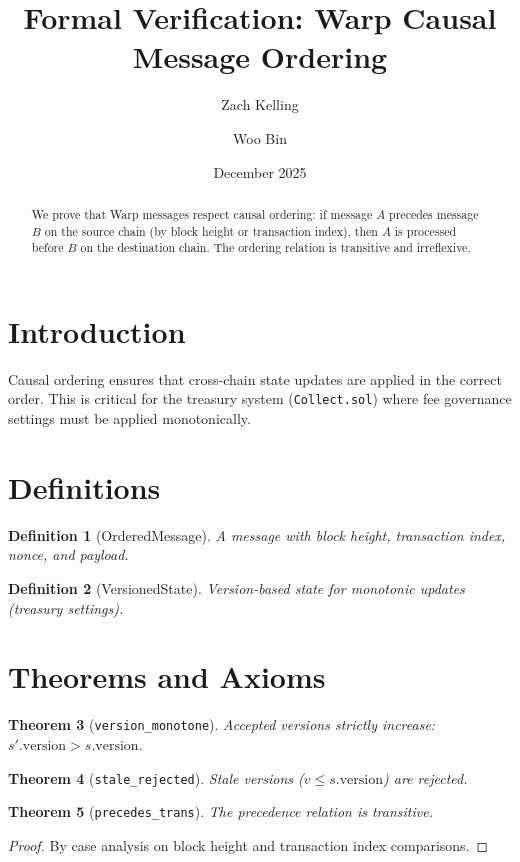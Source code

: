 \documentclass[11pt]{article}
\title{Formal Verification: Warp Causal Message Ordering}
\author{Zach Kelling \and Woo Bin}
\date{December 2025}
\newtheorem{theorem}{Theorem}
\newtheorem{definition}[theorem]{Definition}
\begin{document}
\maketitle

\begin{abstract}
We prove that Warp messages respect causal ordering: if message $A$ precedes message $B$ on the source chain (by block height or transaction index), then $A$ is processed before $B$ on the destination chain. The ordering relation is transitive and irreflexive.
\end{abstract}

\section{Introduction}
Causal ordering ensures that cross-chain state updates are applied in the correct order. This is critical for the treasury system (\texttt{Collect.sol}) where fee governance settings must be applied monotonically.

\section{Definitions}
\begin{definition}[OrderedMessage]
A message with block height, transaction index, nonce, and payload.
\end{definition}

\begin{definition}[VersionedState]
Version-based state for monotonic updates (treasury settings).
\end{definition}


\section{Theorems and Axioms}
\begin{theorem}[\texttt{version\_monotone}]
Accepted versions strictly increase: $s'.\text{version} > s.\text{version}$.
\end{theorem}

\begin{theorem}[\texttt{stale\_rejected}]
Stale versions ($v \leq s.\text{version}$) are rejected.
\end{theorem}

\begin{theorem}[\texttt{precedes\_trans}]
The precedence relation is transitive.
\end{theorem}
\begin{proof}
By case analysis on block height and transaction index comparisons.
\end{proof}
\end{document}
